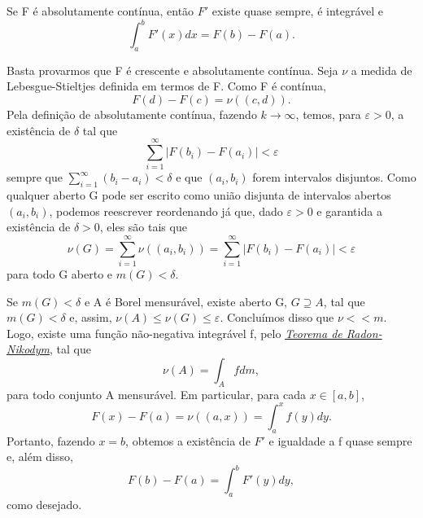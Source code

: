 \documentclass[MeasureTheory/measure_theory.tex]{subfiles}
\begin{document}
\begin{theorem*}
	Se F é absolutamente contínua, então \(F'\) existe quase sempre, é integrável e
	\[
		\int_{a}^{b}F'(x)dx = F(b) - F(a).
	\]
\end{theorem*}
\begin{proof*}
	Basta provarmos que F é crescente e absolutamente contínua. Seja \(\nu \) a medida de Lebesgue-Stieltjes definida em termos de F. Como F é contínua,
	\[
		F(d) - F(c) = \nu ((c, d)).
	\]
	Pela definição de absolutamente contínua, fazendo \(k\to \infty\), temos, para \(\varepsilon > 0\), a existência de \(\delta \) tal que
	\[
		\sum\limits_{i=1}^{\infty}|F(b_{i}) - F(a_{i})| < \varepsilon
	\]
	sempre que \(\sum\limits_{i=1}^{\infty}(b_{i}-a_{i})<\delta \) e que \((a_{i}, b_{i})\) forem intervalos disjuntos. Como qualquer aberto G pode ser escrito como união disjunta de intervalos abertos \((a_{i}, b_{i})\), podemos reescrever reordenando já que,
	dado \(\varepsilon > 0\) e garantida a existência de \(\delta > 0\), eles são tais que
	\[
		\nu (G) = \sum\limits_{i=1}^{\infty}\nu ((a_{i}, b_{i})) = \sum\limits_{i=1}^{\infty}|F(b_{i}) - F(a_{i})| < \varepsilon
	\]
	para todo G aberto e \(m(G) < \delta .\)

	Se \(m(G) < \delta \) e A é Borel mensurável, existe aberto G, \(G\supseteq A\), tal que \(m(G) < \delta \) e, assim, \(\nu (A) \leq \nu (G) \leq \varepsilon .\) Concluímos disso que \(\nu << m.\)
	Logo, existe uma função não-negativa integrável f, pelo \hyperlink{radon_nikodym}{\textit{Teorema de Radon-Nikodym}}, tal que
	\[
		\nu (A) = \int_{A}f dm,
	\]
	para todo conjunto A mensurável. Em particular, para cada \(x\in [a, b]\),
	\[
		F(x) - F(a) = \nu ((a, x)) = \int_{a}^{x}f(y)dy.
	\]
	Portanto, fazendo \(x=b\), obtemos a existência de \(F'\) e igualdade a f quase sempre e, além disso,
	\[
		F(b) - F(a) = \int_{a}^{b}F'(y)dy,
	\]
	como desejado. \qedsymbol
\end{proof*}
\end{document}
